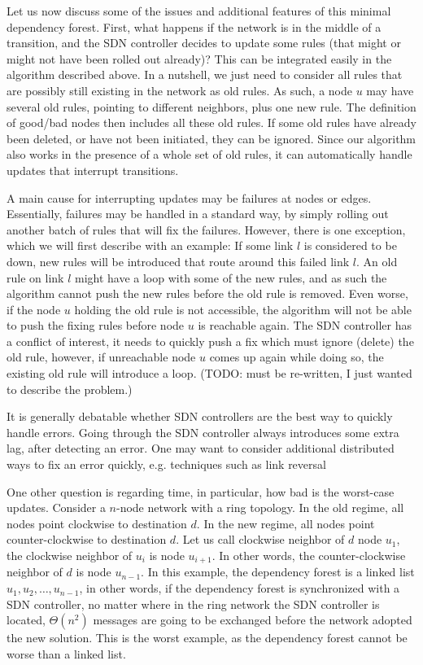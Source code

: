 Let us now discuss some of the issues and additional features of this minimal dependency forest. First, what happens if the network is in the middle of a transition, and the SDN controller decides to update some rules (that might or might not have been rolled out already)? This can be integrated easily in the algorithm described above. In a nutshell, we just need to consider all rules that are possibly still existing in the network as old rules. As such, a node $u$ may have several old rules, pointing to different neighbors, plus one new rule. The definition of good/bad nodes then includes all these old rules. If some old rules have already been deleted, or have not been initiated, they can be ignored. Since our algorithm also works in the presence of a whole set of old rules, it can automatically handle updates that interrupt transitions.

A main cause for interrupting updates may be failures at nodes or edges. Essentially, failures may be handled in a standard way, by simply rolling out another batch of rules that will fix the failures. However, there is one exception, which we will first describe with an example: If some link $l$ is considered to be down, new rules will be introduced that route around this failed link $l$. An old rule on link $l$ might have a loop with some of the new rules, and as such the algorithm cannot push the new rules before the old rule is removed. Even worse, if the node $u$ holding the old rule is not accessible, the algorithm will not be able to push the fixing rules before node $u$ is reachable again. The SDN controller has a conflict of interest, it needs to quickly push a fix which must ignore (delete) the old rule, however, if unreachable node $u$ comes up again while doing so, the existing old rule will introduce a loop. (TODO: must be re-written, I just wanted to describe the problem.)

It is generally debatable whether SDN controllers are the best way to quickly handle errors. Going through the SDN controller always introduces some extra lag, after detecting an error. One may want to consider additional distributed ways to fix an error quickly, e.g. techniques such as link reversal \cite{originallinkreversalpaperforinstanceorsomethingnewer}

One other question is regarding time, in particular, how bad is the worst-case updates. Consider a $n$-node network with a ring topology. In the old regime, all nodes point clockwise to destination $d$. In the new regime, all nodes point counter-clockwise to destination $d$. Let us call clockwise neighbor of $d$ node $u_1$, the clockwise neighbor of $u_i$ is node $u_{i+1}$. In other words, the counter-clockwise neighbor of $d$ is node $u_{n-1}$. In this example, the dependency forest is a linked list $u_1,u_2,\ldots,u_{n-1}$, in other words, if the dependency forest is synchronized with a SDN controller, no matter where in the ring network the SDN controller is located, $\Theta(n^2)$ messages are going to be exchanged before the network adopted the new solution. This is the worst example, as the dependency forest cannot be worse than a linked list.

